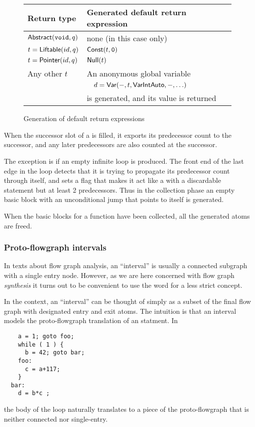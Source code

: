\begin{docpart}
\begin{figure}\begin{center}\begin{tabular}{|l|l|}
\hline
Return type & Generated default return expression \\
\hline \hline
$\textsf{Abstract}(\texttt{void},q)$ & none (in this case only)\\
$t = \textsf{Liftable}(id,q)$ & $\textsf{Const}(t,\texttt{0})$ \\
$t = \textsf{Pointer}(id,q)$ & $\textsf{Null}(t)$ \\
Any other $t$ & An anonymous global variable \\
& $\quad d = \textsf{Var}(-,t,\textsf{VarIntAuto},-,\ldots)$ \\
& is generated, and its value is returned \\
\hline
\end{tabular}\end{center}
\caption{Generation of default return expressions}
\label{fig:c2coreReturnExp}
\end{figure}

When the successor slot of a  is filled, it exports its
predecessor count to the successor, and any later predecessors
are also counted at the successor.

The exception is if an empty infinite loop is produced. The front
end of the last edge in the loop detects that it is trying to
propagate its predecessor count through itself, and sets a flag
that makes it act like a  with a discardable statement but
at least 2 predecessors. Thus in the collection phase an empty
basic block with an unconditional jump that points to itself is
generated.

\medskip
\noindent
When the basic blocks for a function have been collected, all the
generated atoms are freed.

\subsubsection{Proto-flowgraph intervals}
\label{sec:c2coreIntervals}
In texts about flow graph analysis, an ``interval'' is usually
a connected subgraph with a single entry node. However, as we
are here concerned with flow graph \emph{synthesis} it turns
out to be convenient to use the word for a less strict concept.

In the \ctoc context, an ``interval'' can be thought of simply
as a subset of the final flow graph with designated entry and
exit atoms. The intuition is that an interval models the
proto-flowgraph translation of an \ansiC statment. In
\begin{verbatim}
    a = 1; goto foo;
    while ( 1 ) {
      b = 42; goto bar;
    foo:
      c = a+117;
    }
  bar:
    d = b*c ;
\end{verbatim}
the body of the loop naturally translates to a piece of the
proto-flowgraph that is neither connected nor single-entry.


\end{docpart}
